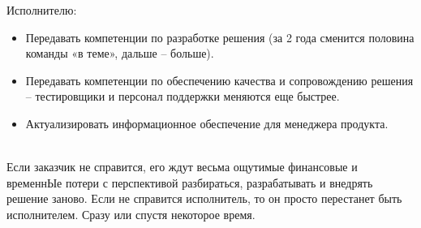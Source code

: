 \documentclass{../industrial-development}
\begin{document}
Исполнителю: \\
\begin{itemize}
\item Передавать компетенции по разработке решения (за 2 года сменится половина команды «в теме», дальше – больше).
\item Передавать компетенции по обеспечению качества и сопровождению решения – тестировщики и персонал поддержки меняются еще быстрее.
\item Актуализировать информационное обеспечение для менеджера продукта.
\end{itemize}\\
Если заказчик не справится, его ждут весьма ощутимые финансовые и временнЫе потери с перспективой разбираться, разрабатывать и внедрять решение заново. Если не справится исполнитель, то он просто перестанет быть исполнителем. Сразу или спустя некоторое время.
\end{document}
